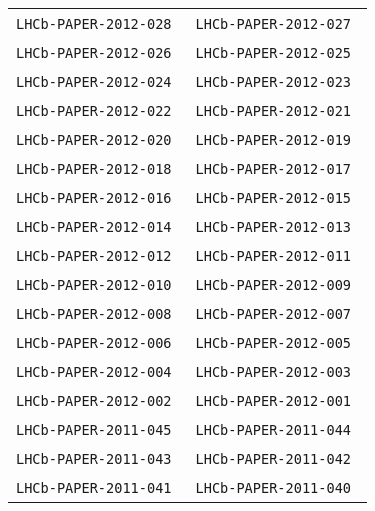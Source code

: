 \begin{center}
\begin{longtable}{ll}
\texttt{LHCb-PAPER-2012-028}~\cite{LHCb-PAPER-2012-028} & 
\texttt{LHCb-PAPER-2012-027}~\cite{LHCb-PAPER-2012-027} \\
\texttt{LHCb-PAPER-2012-026}~\cite{LHCb-PAPER-2012-026} & 
\texttt{LHCb-PAPER-2012-025}~\cite{LHCb-PAPER-2012-025} \\
\texttt{LHCb-PAPER-2012-024}~\cite{LHCb-PAPER-2012-024} & 
\texttt{LHCb-PAPER-2012-023}~\cite{LHCb-PAPER-2012-023} \\
\texttt{LHCb-PAPER-2012-022}~\cite{LHCb-PAPER-2012-022} & 
\texttt{LHCb-PAPER-2012-021}~\cite{LHCb-PAPER-2012-021} \\
\texttt{LHCb-PAPER-2012-020}~\cite{LHCb-PAPER-2012-020} & 
\texttt{LHCb-PAPER-2012-019}~\cite{LHCb-PAPER-2012-019} \\
\texttt{LHCb-PAPER-2012-018}~\cite{LHCb-PAPER-2012-018} & 
\texttt{LHCb-PAPER-2012-017}~\cite{LHCb-PAPER-2012-017} \\
\texttt{LHCb-PAPER-2012-016}~\cite{LHCb-PAPER-2012-016} & 
\texttt{LHCb-PAPER-2012-015}~\cite{LHCb-PAPER-2012-015} \\
\texttt{LHCb-PAPER-2012-014}~\cite{LHCb-PAPER-2012-014} & 
\texttt{LHCb-PAPER-2012-013}~\cite{LHCb-PAPER-2012-013} \\
\texttt{LHCb-PAPER-2012-012}~\cite{LHCb-PAPER-2012-012} & 
\texttt{LHCb-PAPER-2012-011}~\cite{LHCb-PAPER-2012-011} \\
\texttt{LHCb-PAPER-2012-010}~\cite{LHCb-PAPER-2012-010} & 
\texttt{LHCb-PAPER-2012-009}~\cite{LHCb-PAPER-2012-009} \\
\texttt{LHCb-PAPER-2012-008}~\cite{LHCb-PAPER-2012-008} & 
\texttt{LHCb-PAPER-2012-007}~\cite{LHCb-PAPER-2012-007} \\
\texttt{LHCb-PAPER-2012-006}~\cite{LHCb-PAPER-2012-006} & 
\texttt{LHCb-PAPER-2012-005}~\cite{LHCb-PAPER-2012-005} \\
\texttt{LHCb-PAPER-2012-004}~\cite{LHCb-PAPER-2012-004} & 
\texttt{LHCb-PAPER-2012-003}~\cite{LHCb-PAPER-2012-003} \\
\texttt{LHCb-PAPER-2012-002}~\cite{LHCb-PAPER-2012-002} & 
\texttt{LHCb-PAPER-2012-001}~\cite{LHCb-PAPER-2012-001} \\
\midrule
\texttt{LHCb-PAPER-2011-045}~\cite{LHCb-PAPER-2011-045} & 
\texttt{LHCb-PAPER-2011-044}~\cite{LHCb-PAPER-2011-044} \\
\texttt{LHCb-PAPER-2011-043}~\cite{LHCb-PAPER-2011-043} & 
\texttt{LHCb-PAPER-2011-042}~\cite{LHCb-PAPER-2011-042} \\
\texttt{LHCb-PAPER-2011-041}~\cite{LHCb-PAPER-2011-041} & 
\texttt{LHCb-PAPER-2011-040}~\cite{LHCb-PAPER-2011-040} \\

\end{longtable}
\end{center}
